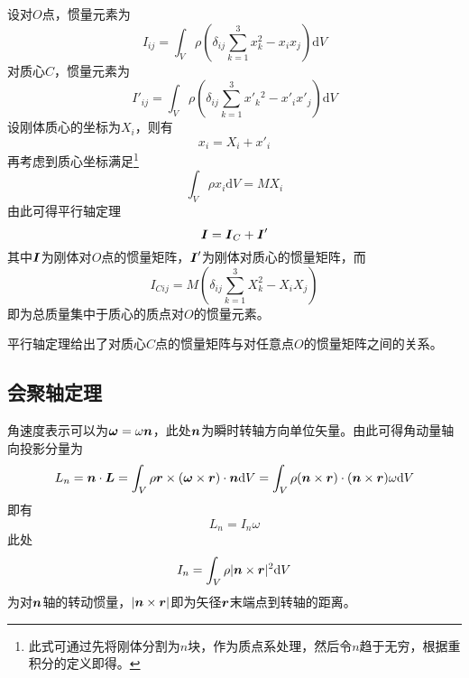 设对$O$点，惯量元素为
\begin{equation*}
	I_{ij} = \int_V \rho \left(\delta_{ij}\sum_{k=1}^3 x_k^2-x_ix_j\right) \mathrm{d} V
\end{equation*}
对质心$C$，惯量元素为
\begin{equation*}
	I'_{ij} = \int_V \rho \left(\delta_{ij}\sum_{k=1}^3 x'_k{}^2-x'_ix'_j\right) \mathrm{d} V
\end{equation*}
设刚体质心的坐标为$X_i$，则有
\begin{equation*}
	x_i = X_i + x'_i
\end{equation*}
再考虑到质心坐标满足\footnote{此式可通过先将刚体分割为$n$块，作为质点系处理，然后令$n$趋于无穷，根据重积分的定义即得。}
\begin{equation*}
	\int_V \rho x_i \mathrm{d} V = MX_i
\end{equation*}
由此可得{\heiti 平行轴定理}
\begin{equation}
	\boldsymbol{I} = \boldsymbol{I}_C + \boldsymbol{I}'
\end{equation}
其中$\boldsymbol{I}$为刚体对$O$点的惯量矩阵，$\boldsymbol{I}'$为刚体对质心的惯量矩阵，而
\begin{equation}
	I_{Cij} = M\left(\delta_{ij}\sum_{k=1}^3 X_k^2-X_iX_j\right)
\end{equation}
即为总质量集中于质心的质点对$O$的惯量元素。

平行轴定理给出了对质心$C$点的惯量矩阵与对任意点$O$的惯量矩阵之间的关系。

\subsection{会聚轴定理}

角速度表示可以为$\boldsymbol{\omega} = \omega\boldsymbol{n}$，此处$\boldsymbol{n}$为瞬时转轴方向单位矢量。由此可得角动量轴向投影分量为
\begin{equation*}
	L_n = \boldsymbol{n} \cdot \boldsymbol{L} = \int_V \rho \boldsymbol{r} \times (\boldsymbol{\omega} \times \boldsymbol{r}) \cdot \boldsymbol{n} \mathrm{d} V = \int_V \rho (\boldsymbol{n} \times \boldsymbol{r}) \cdot (\boldsymbol{n} \times \boldsymbol{r}) \omega \mathrm{d} V
\end{equation*}
即有
\begin{equation}
	L_n = I_n \omega
\end{equation}
此处
\begin{equation}
	I_n = \int_V \rho |\boldsymbol{n} \times \boldsymbol{r}|^2 \mathrm{d} V
\end{equation}
为对$\boldsymbol{n}$轴的转动惯量，$|\boldsymbol{n} \times \boldsymbol{r}|$即为矢径$\boldsymbol{r}$末端点到转轴的距离。

